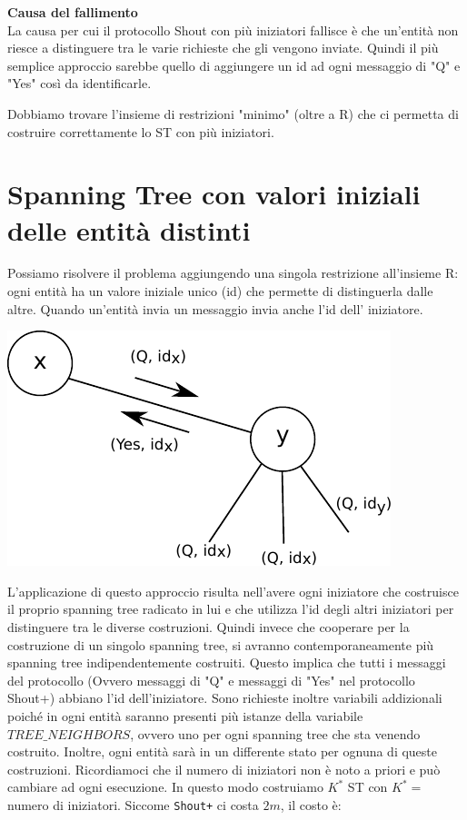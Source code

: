 \textbf{Causa del fallimento}\\
La causa per cui il protocollo Shout con più iniziatori fallisce è che un'entità
non riesce a distinguere tra le varie richieste che gli vengono inviate. Quindi
il più semplice approccio sarebbe quello di aggiungere un id ad ogni messaggio
di "Q" e "Yes" così da identificarle.

Dobbiamo trovare l'insieme di restrizioni "minimo" (oltre a R) che ci permetta
di costruire correttamente lo ST con più iniziatori.

\section{Spanning Tree con valori iniziali delle entità distinti}
Possiamo risolvere il problema aggiungendo una singola restrizione all'insieme
R: ogni entità ha un valore iniziale unico (id) che permette di distinguerla
dalle altre. Quando un'entità invia un messaggio invia anche l'id dell'
iniziatore.

\begin{center}
    \includegraphics[scale=0.8]{capitoli/costruzione-spanning-tree/imgs/n_38}
\end{center}

L'applicazione di questo approccio risulta nell'avere ogni iniziatore che
costruisce il proprio spanning tree radicato in lui e che utilizza l'id degli
altri iniziatori per distinguere tra le diverse costruzioni. Quindi invece che
cooperare per la costruzione di un singolo spanning tree, si avranno
contemporaneamente più spanning tree indipendentemente costruiti. Questo implica
che  tutti i messaggi del protocollo (Ovvero messaggi di "Q" e messaggi di "Yes"
nel protocollo Shout+) abbiano l'id dell'iniziatore. Sono richieste inoltre
variabili addizionali poiché in ogni entità saranno presenti più istanze della
variabile $TREE\_NEIGHBORS$, ovvero uno per ogni spanning tree che sta venendo
costruito. Inoltre, ogni entità sarà in un differente stato per ognuna di queste
costruzioni. Ricordiamoci che il numero di iniziatori non è noto a priori e può
cambiare ad ogni esecuzione. In questo modo costruiamo $K^*$ ST con $K^*=$
numero di iniziatori. Siccome \texttt{Shout+} ci costa $2m$, il costo è:

